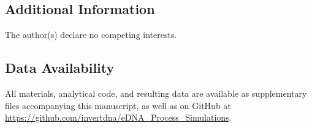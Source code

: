 \documentclass[fleqn,11pt,lineno]{wlscirep}
\begin{document}
\subsection{Additional Information}\label{additional}

The author(s) declare no competing interests.

\subsection{Data Availability}

All materials, analytical code, and resulting data are available as supplementary files accompanying this manuscript, as well as on GitHub at \url{https://github.com/invertdna/eDNA_Process_Simulations}. 

\clearpage

%

\end{document}
